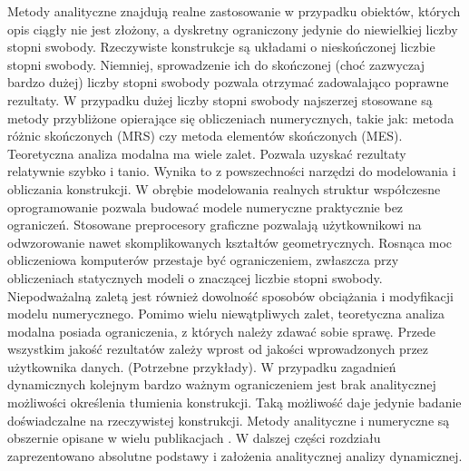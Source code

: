 Metody analityczne znajdują realne zastosowanie w przypadku obiektów, których opis ciągły nie jest złożony, a dyskretny ograniczony jedynie do niewielkiej liczby stopni swobody. Rzeczywiste konstrukcje są układami o nieskończonej liczbie stopni swobody. Niemniej, sprowadzenie ich do skończonej (choć zazwyczaj bardzo dużej) liczby stopni swobody pozwala otrzymać zadowalająco poprawne rezultaty. W przypadku dużej liczby stopni swobody najszerzej stosowane są metody przybliżone opierające się obliczeniach numerycznych, takie jak: metoda różnic skończonych (MRS) czy metoda elementów skończonych (MES). Teoretyczna analiza modalna ma wiele zalet. Pozwala uzyskać rezultaty relatywnie szybko i tanio. Wynika to z powszechności narzędzi do modelowania i obliczania konstrukcji. W obrębie modelowania realnych struktur współczesne oprogramowanie pozwala budować modele numeryczne praktycznie bez ograniczeń. Stosowane preprocesory graficzne pozwalają użytkownikowi na odwzorowanie nawet skomplikowanych kształtów geometrycznych. Rosnąca moc obliczeniowa komputerów przestaje być ograniczeniem, zwłaszcza przy obliczeniach statycznych modeli o znaczącej liczbie stopni swobody. Niepodważalną zaletą jest również dowolność sposobów obciążania i modyfikacji modelu numerycznego. Pomimo wielu niewątpliwych zalet, teoretyczna analiza modalna posiada ograniczenia, z których należy zdawać sobie sprawę. Przede wszystkim jakość rezultatów zależy wprost od jakości wprowadzonych przez użytkownika danych. (Potrzebne przykłady). W przypadku zagadnień dynamicznych kolejnym bardzo ważnym ograniczeniem jest brak analitycznej możliwości określenia tłumienia konstrukcji. Taką możliwość daje jedynie badanie doświadczalne na rzeczywistej konstrukcji. Metody analityczne i numeryczne są obszernie opisane w wielu publikacjach \parencite{Chmielewski1998,Chopra2012a,Rucka2014}. W dalszej części rozdziału zaprezentowano absolutne podstawy i założenia analitycznej analizy dynamicznej.



